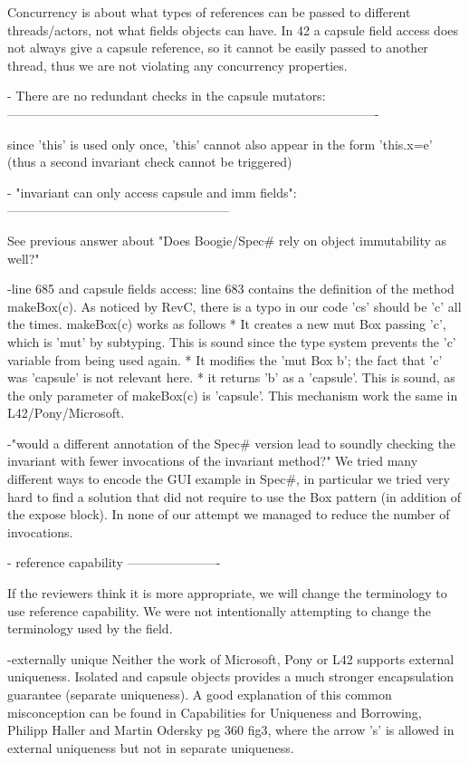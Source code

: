 Concurrency is about what types of references can be passed to different threads/actors,
not what fields objects can have.
In 42 a capsule field access does not always give a capsule reference,
so it cannot be easily passed to another thread, thus we are not violating any concurrency properties.

- There are no redundant checks in the capsule mutators:
----------------------------------------------------------------------------------------

 since 'this' is used only once, 'this' cannot also appear in the form 'this.x=e' (thus a second invariant check cannot be triggered)

- "invariant can only access capsule and imm fields":
-----------------------------------------------------

See previous answer about "Does Boogie/Spec# rely on object immutability as well?"

-line 685 and capsule fields access:
line 683 contains the definition of the method makeBox(c).
As noticed by RevC, there is a typo in our code 'cs' should be 'c' all the times.
makeBox(c) works as follows
* It creates a new mut Box passing 'c', which is 'mut' by subtyping.
This is sound since the type system prevents the 'c' variable from being used again.
* It modifies the 'mut Box b'; the fact that 'c' was 'capsule' is not relevant here.
* it returns 'b' as a 'capsule'.  This is sound, as the only parameter 
of makeBox(c) is 'capsule'. This mechanism work the same in L42/Pony/Microsoft.

-"would a different annotation of the Spec# version lead to soundly checking the invariant with fewer invocations of the invariant method?"
We tried many different ways to encode the GUI example in Spec#, in particular we tried very hard to find a solution that did not require to use the Box pattern (in addition of the expose block).
In none of our attempt we managed to reduce the number of invocations.

- reference capability
----------------------

If the reviewers think it is more appropriate,
we will change the terminology to use reference capability.
We were not intentionally attempting to change the terminology used by the field.

-externally unique
Neither the work of Microsoft, Pony or L42 supports external uniqueness.
Isolated and capsule objects provides a much stronger encapsulation guarantee (separate uniqueness).
A good explanation of this common misconception can be found in
Capabilities for Uniqueness and Borrowing, Philipp Haller and Martin Odersky pg 360 fig3,
where the arrow 's' is allowed in external uniqueness but not in separate uniqueness.

